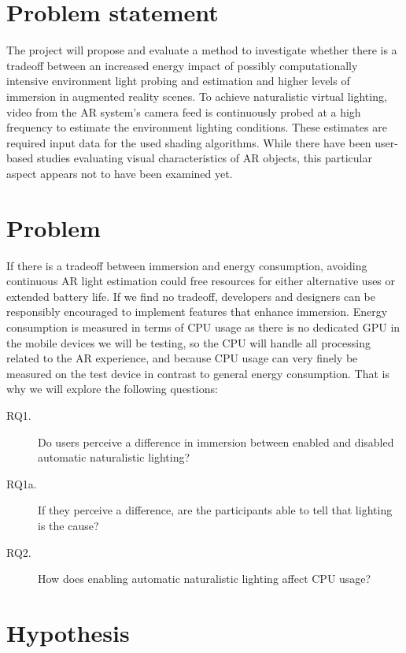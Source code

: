 \documentclass[12pt,twoside,english]{article}
\begin{document}
\section{Problem statement}
\label{sect:problem_statement}

The project will propose and evaluate a method to investigate whether there is a tradeoff between an increased energy impact of possibly computationally intensive environment light probing and estimation and higher levels of immersion in augmented reality scenes.
To achieve naturalistic virtual lighting, video from the AR system's camera feed is continuously probed at a high frequency to estimate the environment lighting conditions.
These estimates are required input data for the used shading algorithms.
While there have been user-based studies evaluating visual characteristics of \gls{AR} objects, this particular aspect appears not to have been examined yet.

\section{Problem}
\label{sect:problem}

If there is a tradeoff between immersion and energy consumption, avoiding continuous \gls{AR} light estimation could free resources for either alternative uses or extended battery life.
If we find no tradeoff, developers and designers can be responsibly encouraged to implement features that enhance immersion.
Energy consumption is measured in terms of \gls{CPU} usage as there is no dedicated \gls{GPU} in the mobile devices we will be testing, so the \gls{CPU} will handle all processing related to the \gls{AR} experience, and because CPU usage can very finely be measured on the test device in contrast to general energy consumption.
That is why we will explore the following questions:

\begin{description}
    \item[RQ1.] Do users perceive a difference in immersion between enabled and disabled automatic naturalistic lighting?
    \item[RQ1a.] If they perceive a difference, are the participants able to tell that lighting is the cause?
    \item[RQ2.] How does enabling automatic naturalistic lighting affect \gls{CPU} usage?
\end{description}

\section{Hypothesis}
\label{sect:hypothesis}
\end{document}
